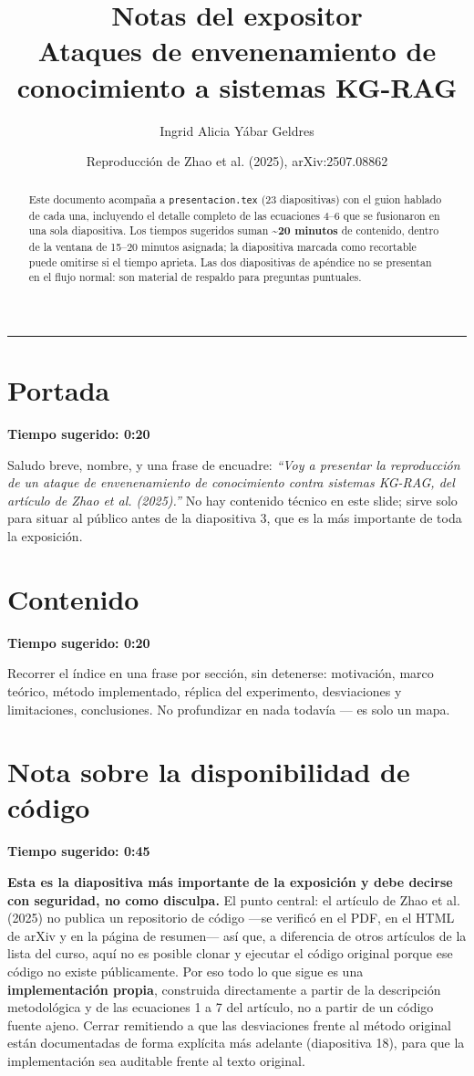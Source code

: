 \documentclass[11pt]{article}
\title{Notas del expositor\\\large Ataques de envenenamiento de conocimiento a sistemas KG-RAG}
\author{Ingrid Alicia Yábar Geldres}
\date{Reproducción de Zhao et al. (2025), arXiv:2507.08862}
\newcommand{\tiempo}[1]{{\small\color{timecolor}\textbf{Tiempo sugerido: #1}}\par\vspace{0.3em}}
\begin{document}
\maketitle

\begin{abstract}
\noindent Este documento acompaña a \texttt{presentacion.tex} (23 diapositivas) con el guion
hablado de cada una, incluyendo el detalle completo de las ecuaciones 4--6 que se
fusionaron en una sola diapositiva. Los tiempos sugeridos suman
\textbf{\textasciitilde 20 minutos} de contenido, dentro de la ventana de 15--20 minutos
asignada; la diapositiva marcada como recortable puede omitirse si el tiempo aprieta. Las
dos diapositivas de apéndice no se presentan en el flujo normal: son material de respaldo
para preguntas puntuales.
\end{abstract}

\tableofcontents
\vspace{1em}
\hrule

\section{Portada}
\tiempo{0:20}
Saludo breve, nombre, y una frase de encuadre: \emph{``Voy a presentar la reproducción de
un ataque de envenenamiento de conocimiento contra sistemas KG-RAG, del artículo de Zhao
et al. (2025).''} No hay contenido técnico en este slide; sirve solo para situar al
público antes de la diapositiva 3, que es la más importante de toda la exposición.

\section{Contenido}
\tiempo{0:20}
Recorrer el índice en una frase por sección, sin detenerse: motivación, marco teórico,
método implementado, réplica del experimento, desviaciones y limitaciones, conclusiones.
No profundizar en nada todavía --- es solo un mapa.

\section{Nota sobre la disponibilidad de código}
\tiempo{0:45}
\textbf{Esta es la diapositiva más importante de la exposición y debe decirse con
seguridad, no como disculpa.} El punto central: el artículo de Zhao et al. (2025) no
publica un repositorio de código ---se verificó en el PDF, en el HTML de arXiv y en la
página de resumen--- así que, a diferencia de otros artículos de la lista del curso, aquí
no es posible clonar y ejecutar el código original porque ese código no existe
públicamente. Por eso todo lo que sigue es una \textbf{implementación propia}, construida
directamente a partir de la descripción metodológica y de las ecuaciones 1 a 7 del
artículo, no a partir de un código fuente ajeno. Cerrar remitiendo a que las desviaciones
frente al método original están documentadas de forma explícita más adelante (diapositiva
18), para que la implementación sea auditable frente al texto original.
\end{document}
